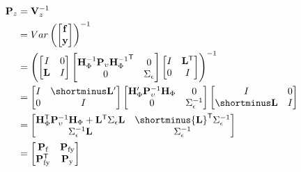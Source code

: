 \documentclass[notitlepage,a4paper,12pt]{article}
\newcommand{\transpose}[1]{{#1}^{\sf{T}}}
\begin{document}
\begin{align*}
    \mathbf{P}_z 
    &= 
    \mathbf{V}^{-1}_z \\
    &= 
    Var\left(
    \begin{bmatrix}
        \mathbf{f} \\
        \mathbf{y}
    \end{bmatrix}
    \right)^{-1} \\
    &=  
    \left(
    \begin{bmatrix}
        I & 0 \\
        \mathbf{L} & I
    \end{bmatrix}
    \begin{bmatrix}
        \mathbf{H}^{-1}_{\Phi} \mathbf{P}_{\upsilon} \transpose{\mathbf{H}^{-1}_{\Phi}} & 0 \\
        0 & \Sigma_{\epsilon}
    \end{bmatrix} 
    \begin{bmatrix}
        I & \mathbf{L}^{\sf{T}} \\
        0 & I
    \end{bmatrix}
    \right)^{-1}\\
    &=
    \begin{bmatrix}
        I & \shortminus\mathbf{L}' \\
        0 & I
    \end{bmatrix}
    \begin{bmatrix}
        \mathbf{H}'_{\Phi} \mathbf{P}^{-1}_{\upsilon} \mathbf{H}_{\Phi} & 0 \\
        0 & \Sigma^{-1}_{\epsilon}
    \end{bmatrix} 
    \begin{bmatrix}
        I & 0 \\
        \shortminus\mathbf{L} & I 
    \end{bmatrix} \\
    &=
    \begin{bmatrix}
         \transpose{\mathbf{H}}_{\Phi} \mathbf{P}^{-1}_{\upsilon} \mathbf{H}_{\Phi} + \transpose{\mathbf{L}}\Sigma_{\epsilon}\mathbf{L}  & \shortminus \transpose{\mathbf{L}} \Sigma^{-1}_{\epsilon} \\
        \Sigma^{-1}_{\epsilon} \mathbf{L} & \Sigma^{-1}_{\epsilon}
    \end{bmatrix} \\
    &= 
    \begin{bmatrix}
        \mathbf{P}_{\text{f}} & \mathbf{P}_{\text{fy}} \\
        \transpose{\mathbf{P}}_{\text{fy}} & \mathbf{P}_{\text{y}}  
    \end{bmatrix}
\end{align*}
\end{document}
